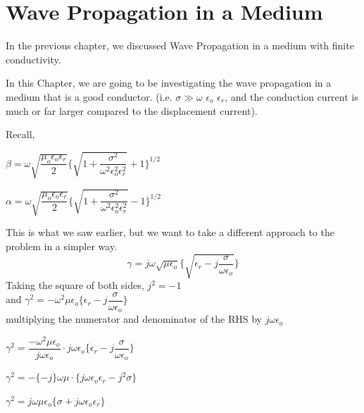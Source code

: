 \chapter{Wave Propagation in a Medium}\label{lec:lec26}
In the previous chapter, we discussed Wave Propagation in a medium with finite conductivity.

In this Chapter, we are going to be investigating the wave propagation in a medium that is a good conductor. (i.e. $\sigma \gg \omega$ $\epsilon_{o}$ $\epsilon_{r}$, and the conduction current is much or far larger compared to the displacement current). \newline

Recall,
\begin{center}
$\beta=\omega\sqrt{\dfrac{\mu_{o}\epsilon_{o}\epsilon_{r}}{2}}\Bigg\{{\sqrt{1+\dfrac{\sigma^{2}}{\omega^{2}\epsilon_{o}^{2}\epsilon_{r}^{2}}}+1 }\Bigg\}^{1/2}$
\end{center}

\begin{center}
$\alpha=\omega\sqrt{\dfrac{\mu_{o}\epsilon_{o}\epsilon_{r}}{2}}\Bigg\{\sqrt{1+\dfrac{\sigma^{2}}{\omega^{2}\epsilon_{o}^{2}\epsilon_{r}^{2}}}  -1\Bigg\}^{1/2}$	
\end{center}

This is what we saw earlier, but we want to take a different approach to the problem in a simpler way.
\begin{equation}
\gamma=j\omega\sqrt{\mu\epsilon_{o}}\Bigg\{\sqrt{\epsilon_{r}-j\dfrac{\sigma}{\omega\epsilon_{o}}}\Bigg\}
\end{equation}		
Taking the square of both sides,
$j^{2}= -1$\\ 
 and $\gamma^{2}=-\omega^{2}\mu\epsilon_{o}\Bigg\{\epsilon_{r}-j\dfrac{\sigma}{\omega\epsilon_{o}}\Bigg\}$\\
multiplying the numerator and denominator of the RHS  by $j\omega\epsilon_{o}$

$\gamma^{2}=\dfrac{-\omega^{2}\mu\epsilon_{o}}{j\omega\epsilon_{o}}\cdot j\omega\epsilon_{o}\Bigg\{\epsilon_{r}-j\dfrac{\sigma}{\omega\epsilon_{o}}\Bigg\}$

\begin{center}
$\gamma^{2}=-\{-j\}\omega\mu\cdot\{j\omega\epsilon_{o}\epsilon_{r}-j^{2}\sigma\}$
\end{center}

\begin{center}
$\gamma^{2}=j\omega\mu\epsilon_{o}\{\sigma+j\omega\epsilon_{o}\epsilon_{r}\}$	
\end{center}

